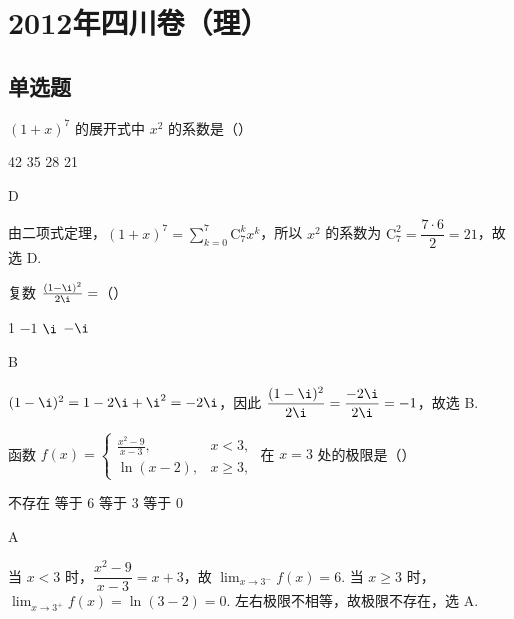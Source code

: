 \chapter{2012年四川卷（理）}

\section{单选题}

\begin{problem}
\((1 + x)^{7}\) 的展开式中 \(x^{2}\) 的系数是（\quad）

\choices
    {42}
    {35}
    {28}
    {21}
\end{problem}

\begin{answer}
D
\end{answer}

\begin{solution}
由二项式定理，\((1+x)^7=\sum_{k=0}^{7}\mathrm C_7^k x^k\)，所以 \(x^2\) 的系数为
\(\mathrm C_7^2=\dfrac{7\cdot6}{2}=21\)，故选 D.
\end{solution}

\begin{problem}
复数 \(\frac{(1 - \i)^2}{2\i} =\)（\quad）

\choices
    {1}
    {\(-1\)}
    {\(\i\)}
    {\(-\i\)}
\end{problem}

\begin{answer}
B
\end{answer}

\begin{solution}
\((1-\i)^2=1-2\i+\i^2=-2\i\)，因此
\(\dfrac{(1-\i)^2}{2\i}=\dfrac{-2\i}{2\i}=-1\)，故选 B.
\end{solution}

\begin{problem}
函数 \( f(x) = \begin{cases}
\frac{x^2 - 9}{x - 3}, & x < 3,\\
\ln (x - 2), & x \geqslant 3,
\end{cases} \) 在 \( x = 3 \) 处的极限是（\quad）

\choices
    {不存在}
    {等于 6}
    {等于 3}
    {等于 0}
\end{problem}

\begin{answer}
A
\end{answer}

\begin{solution}
当 \(x<3\) 时，\(\dfrac{x^2-9}{x-3}=x+3\)，故
\(\displaystyle\lim_{x\to3^-}f(x)=6\). 当 \(x\geqslant3\) 时，
\(\displaystyle\lim_{x\to3^+}f(x)=\ln(3-2)=0\). 左右极限不相等，故极限不存在，选 A.
\end{solution}

